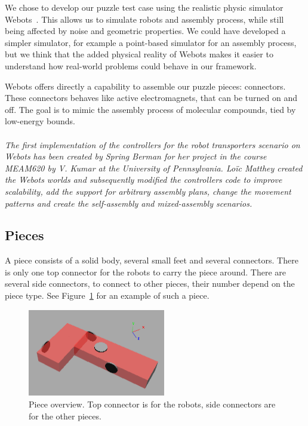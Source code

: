 	We chose to develop our puzzle test case using the realistic physic simulator Webots~\cite{Michel:2004p10762}. This allows us to simulate robots and assembly process, while still being affected by noise and geometric properties. We could have developed a simpler simulator, for example a point-based simulator for an assembly process, but we think that the added physical reality of Webots makes it easier to understand how real-world problems could behave in our framework.
	
	Webots offers directly a capability to assemble our puzzle pieces: connectors. These connectors behaves like active electromagnets, that can be turned on and off. The goal is to mimic the assembly process of molecular compounds, tied by low-energy bounds.
	
	\paragraph{}
\textit{The first implementation of the controllers for the robot transporters scenario on Webots has been created by Spring Berman for her project in the course MEAM620 by V. Kumar at the University of Pennsylvania. Lo\"ic Matthey created the Webots worlds and subsequently modified the controllers code to improve scalability, add the support for arbitrary assembly plans, change the movement patterns and create the self-assembly and mixed-assembly scenarios.}
	
	\subsection{Pieces} %
	\label{sub:pieces}
	
		A piece consists of a solid body, several small feet and several connectors. There is only one top connector for the robots to carry the piece around. There are several side connectors, to connect to other pieces, their number depend on the piece type. See Figure~\ref{fig:piece_alone_overview} for an example of such a piece.		
		\begin{figure}[h]
			\centering
				\includegraphics[width=6cm]{img/piece_alone.png}
			\caption{Piece overview. Top connector is for the robots, side connectors are for the other pieces.}
			\label{fig:piece_alone_overview}
		\end{figure}
	
